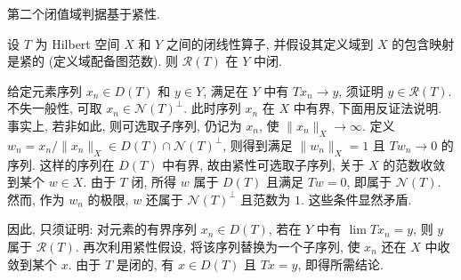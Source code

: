 第二个闭值域判据基于紧性.

\begin{Theorem}\label{thm:compact-domain-closed-range}
设 $T$ 为 Hilbert 空间 $X$ 和 $Y$ 之间的闭线性算子, 并假设其定义域到 $X$ 的包含映射是紧的 (定义域配备图范数). 则 $\mathcal R(T)$ 在 $Y$ 中闭.
\end{Theorem}

\begin{Proof}
给定元素序列 $x_n\in D(T)$ 和 $y\in Y$, 满足在 $Y$ 中有 $Tx_n\to y$, 须证明 $y\in\mathcal R(T)$. 不失一般性, 可取 $x_n\in\mathcal N(T)^\perp$. 此时序列 $x_n$ 在 $X$ 中有界, 下面用反证法说明. 事实上, 若非如此, 则可选取子序列, 仍记为 $x_n$, 使 $\|x_n\|_X\to\infty$. 定义 $w_n=x_n/\|x_n\|_X\in D(T)\cap\mathcal N(T)^\perp$, 则得到满足 $\|w_n\|_X=1$ 且 $Tw_n\to0$ 的序列. 这样的序列在 $D(T)$ 中有界, 故由紧性可选取子序列, 关于 $X$ 的范数收敛到某个 $w\in X$. 由于 $T$ 闭, 所得 $w$ 属于 $D(T)$ 且满足 $Tw=0$, 即属于 $\mathcal N(T)$. 然而, 作为 $w_n$ 的极限, $w$ 还属于 $\mathcal N(T)^\perp$ 且范数为 $1$. 这些条件显然矛盾.

因此, 只须证明: 对元素的有界序列 $x_n\in D(T)$, 若在 $Y$ 中有 $\lim Tx_n=y$, 则 $y$ 属于 $\mathcal R(T)$. 再次利用紧性假设, 将该序列替换为一个子序列, 使 $x_n$ 还在 $X$ 中收敛到某个 $x$. 由于 $T$ 是闭的, 有 $x\in D(T)$ 且 $Tx=y$, 即得所需结论.
\end{Proof}
